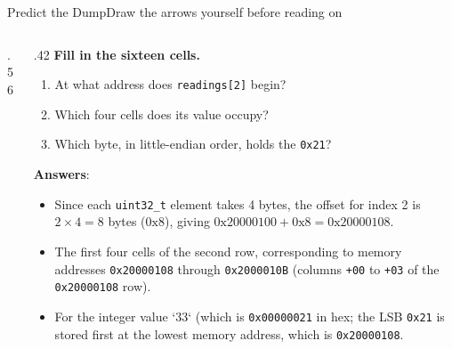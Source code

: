 \documentclass[9pt,aspectratio=169,xcolor=table]{beamer}
\begin{document}
{\begin{frame}[fragile]{Predict the Dump}{Draw the arrows yourself before reading on}
\begin{columns}[c]
\begin{column}{.56\textwidth}
\vspace{1mm}
        \begin{center}
        \end{center}
    \end{column}
    \begin{column}{.42\textwidth}
        \textbf{Fill in the sixteen cells.}
        {\small
        \begin{enumerate}\itemsep1pt
            \item At what address does \texttt{readings[2]} begin?
            \item Which four cells does its value occupy?
            \item Which byte, in little-endian order, holds the \texttt{0x21}?
        \end{enumerate}}
        \vspace{2mm}
        {\small \textbf{Answers}:
        	\begin{itemize}
        		\item  Since each \texttt{uint32\_t} element takes 4 bytes, the offset for index 2 is $2 \times 4 = 8$ bytes ($0\text{x8}$), giving $0\text{x20000100} + 0\text{x8} = 0\text{x20000108}$.
        		\item      		The first four cells of the second row, corresponding to memory addresses \texttt{0x20000108} through \texttt{0x2000010B} (columns \texttt{+00} to \texttt{+03} of the \texttt{0x20000108} row).
        		\item         		For the integer value `33` (which is \texttt{0x00000021} in hex; the LSB \texttt{0x21} is stored first at the lowest memory address, which is \texttt{0x20000108}.
        	\end{itemize}
        		}
    \end{column}
    \end{columns}
\end{frame}
}
\end{document}
